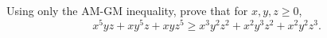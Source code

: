 Using only the AM-GM inequality, prove that for $x,y,z\ge0$,
\[x^5yz+xy^5z+xyz^5\ge x^3y^2z^2+x^2y^3z^2+x^2y^2z^3.\]
